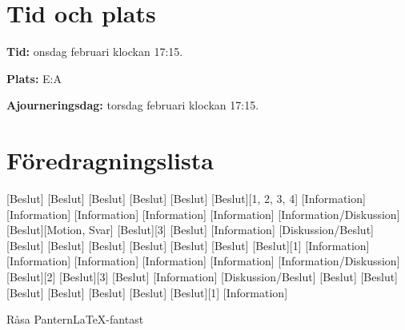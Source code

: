 \documentclass{dseknotice}
\begin{document}
\setdate{\today}

\maketitle
\section*{Tid och plats}
\textbf{Tid:} onsdag  februari klockan 17:15.

\textbf{Plats:} E:A

\textbf{Ajourneringsdag:} torsdag  februari klockan 17:15.

\section*{Föredragningslista}
\begin{agenda}
    [Beslut]
    [Beslut]
    [Beslut]
    [Beslut]
    [Beslut]
    [Beslut][1, 2, 3, 4]
    [Information]
    [Information]
    [Information]
    [Information]
    [Information]
    [Information/Diskussion]
    [Beslut][Motion, Svar]
    [Beslut][3]
    [Beslut]
    [Information]
    [Diskussion/Beslut]
    [Beslut]
    [Beslut]
    [Beslut]
    [Beslut]
    [Beslut]
    [Beslut]
    [Beslut][1]
    [Information]
    [Information]
    [Information]
    [Information]
    [Information]
    [Information/Diskussion]
    [Beslut][2]
    [Beslut][3]
    [Beslut]
    [Information]
    [Diskussion/Beslut]
    [Beslut]
    [Beslut]
    [Beslut]
    [Beslut]
    [Beslut]
    [Beslut]
    [Beslut][1]
    [Information]
\end{agenda}

\medskip

\signature{För D-sektionen, dag som ovan}{Råsa Pantern}{\LaTeX-fantast}
\end{document}
